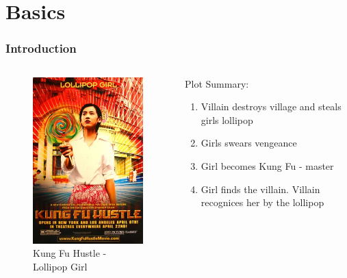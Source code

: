 \section{Basics}

\begin{frame}
	\frametitle{Introduction}
	\begin{columns}
		\begin{column}{0.5\textwidth}
			\begin{figure}
				\centering
				\includegraphics[width=0.8\linewidth]{Images/lollipop}
				\caption{Kung Fu Hustle - Lollipop Girl}
				\label{fig:lollipop}
			\end{figure}
		\end{column}
		\begin{column}{0.5\textwidth}
			\begin{Large}
				Plot Summary:
				\begin{enumerate}
					\item Villain destroys village and steals girls lollipop
					\item Girls swears vengeance
					\item Girl becomes Kung Fu - master
					\item Girl finds the villain. Villain recognices her by the lollipop	
				\end{enumerate}
			\end{Large}
		\end{column}
	\end{columns}
\end{frame}

